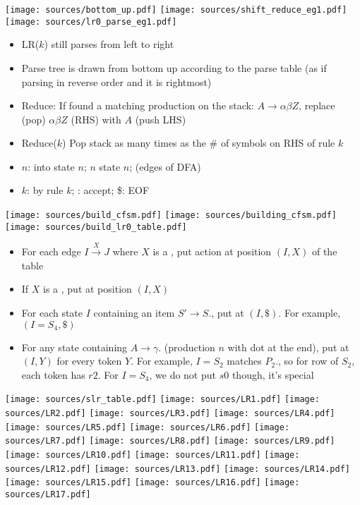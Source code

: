   \texttt{[image: sources/bottom\_up.pdf]}
  \texttt{[image: sources/shift\_reduce\_eg1.pdf]}
  \texttt{[image: sources/lr0\_parse\_eg1.pdf]}
  \begin{itemize}
  \item LR($k$) still parses from left to right
  \item Parse tree is drawn from bottom up according to the parse table (as if parsing in reverse order and it is rightmost)
  \item Reduce: If found a matching production on the stack: $A\to \alpha\beta Z$, replace (pop) $\alpha\beta Z$ (RHS) with $A$ (push LHS)
  \item Reduce($k$) Pop stack as many times as the \# of symbols on RHS of rule $k$
  \item {}$n$:  into state $n$; $n$  state $n$; (edges of DFA)
  \item {}$k$:  by rule $k$; : accept; \$: EOF
  \end{itemize}

  \texttt{[image: sources/build\_cfsm.pdf]}
  \texttt{[image: sources/building\_cfsm.pdf]}
  \texttt{[image: sources/build\_lr0\_table.pdf]}
  \begin{itemize}
  \item For each edge $I\overset{X}{\to}J$ where $X$ is a , put action  at position $(I, X)$ of the table
  \item If $X$ is a , put  at position $(I,X)$
  \item For each state $I$ containing an item $S'\to S.$, put  at $(I,\$)$. For example, $(I=S_4,\$)$
  \item For any state containing $A\to\gamma.$ (production $n$ with dot at the end), put  at $(I,Y)$ for every token $Y$.
    For example, $I=S_2$ matches $P_2.$, so for row of $S_2$, each token has $r2$. For $I=S_4$, we do not put $s0$ though, it's special
  \end{itemize}

  \texttt{[image: sources/slr\_table.pdf]}
  \texttt{[image: sources/LR1.pdf]}
  \texttt{[image: sources/LR2.pdf]}
  \texttt{[image: sources/LR3.pdf]}
  \texttt{[image: sources/LR4.pdf]}
  \texttt{[image: sources/LR5.pdf]}
  \texttt{[image: sources/LR6.pdf]}
  \texttt{[image: sources/LR7.pdf]}
  \texttt{[image: sources/LR8.pdf]}
  \texttt{[image: sources/LR9.pdf]}
  \texttt{[image: sources/LR10.pdf]}
  \texttt{[image: sources/LR11.pdf]}
  \texttt{[image: sources/LR12.pdf]}
  \texttt{[image: sources/LR13.pdf]}
  \texttt{[image: sources/LR14.pdf]}
  \texttt{[image: sources/LR15.pdf]}
  \texttt{[image: sources/LR16.pdf]}
  \texttt{[image: sources/LR17.pdf]}

